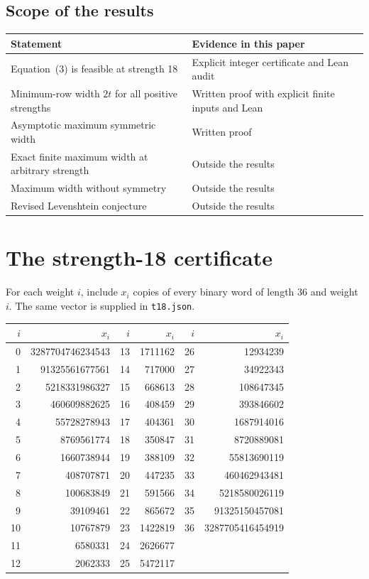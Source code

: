 \documentclass[11pt]{article}
\newcommand{\code}[1]{\texttt{#1}}
\begin{document}
\subsection{Scope of the results}
\begin{center}
\small
\begin{tabular}{@{}p{.51\linewidth}p{.43\linewidth}@{}}
\toprule
Statement & Evidence in this paper \\
\midrule
Equation~(3) is feasible at strength 18 & Explicit integer certificate and Lean audit \\
Minimum-row width \(2t\) for all positive strengths & Written proof with explicit finite inputs and Lean \\
Asymptotic maximum symmetric width & Written proof \\
Exact finite maximum width at arbitrary strength & Outside the results \\
Maximum width without symmetry & Outside the results \\
Revised Levenshtein conjecture & Outside the results \\
\bottomrule
\end{tabular}
\end{center}

\appendix
\section{The strength-18 certificate}\label{sec:certificate}
For each weight \(i\), include \(x_i\) copies of every binary word of
length \(36\) and weight \(i\). The same vector is supplied in
\code{t18.json}.
\begin{center}\small
\begin{tabular}{@{}rr@{\qquad}rr@{\qquad}rr@{}}
\toprule
\(i\) & \(x_i\) & \(i\) & \(x_i\) & \(i\) & \(x_i\)\\
\midrule
0 & 3287704746234543 & 13 & 1711162 & 26 & 12934239\\
1 & 91325561677561 & 14 & 717000 & 27 & 34922343\\
2 & 5218331986327 & 15 & 668613 & 28 & 108647345\\
3 & 460609882625 & 16 & 408459 & 29 & 393846602\\
4 & 55728278943 & 17 & 404361 & 30 & 1687914016\\
5 & 8769561774 & 18 & 350847 & 31 & 8720889081\\
6 & 1660738944 & 19 & 388109 & 32 & 55813690119\\
7 & 408707871 & 20 & 447235 & 33 & 460462943481\\
8 & 100683849 & 21 & 591566 & 34 & 5218580026119\\
9 & 39109461 & 22 & 865672 & 35 & 91325150457081\\
10 & 10767879 & 23 & 1422819 & 36 & 3287705416454919\\
11 & 6580331 & 24 & 2626677 &  & \\
12 & 2062333 & 25 & 5472117 &  & \\
\bottomrule
\end{tabular}
\end{center}
\end{document}
